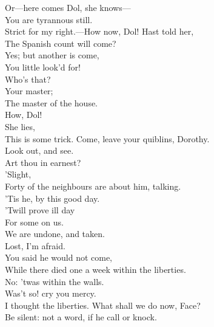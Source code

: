 \documentclass[a4paper,oneside]{memoir}
\begin{document}
\begin{drama*}
Or---here comes Dol, she knows---\\
\subtlespeaks {} You are tyrannous still.\\
\facespeaks Strict for my right.---How now, Dol! Hast told her,\\
The Spanish count will come?\\
\dolspeaks {} Yes; but another is come,\\
You little look'd for!\\
\facespeaks {} Who's that?\\
\dolspeaks {} Your master;\\
The master of the house.\\
\subtlespeaks {} How, Dol!\\
\facespeaks {} She lies,\\
This is some trick. Come, leave your quiblins, Dorothy.\\
\dolspeaks Look out, and see.\\
\subtlespeaks {} Art thou in earnest?\\
\dolspeaks {} 'Slight,\\
Forty of the neighbours are about him, talking.\\
\facespeaks 'Tis he, by this good day.\\
\dolspeaks {} 'Twill prove ill day\\
For some on us.\\
\facespeaks {} We are undone, and taken.\\
\dolspeaks Lost, I'm afraid.\\
\subtlespeaks {} You said he would not come,\\
While there died one a week within the liberties.\\
\facespeaks No: 'twas within the walls.\\
\subtlespeaks {} Was't so! cry you mercy.\\
I thought the liberties. What shall we do now, Face?\\
\facespeaks Be silent: not a word, if he call or knock.\\

\end{drama*}
\end{document}

